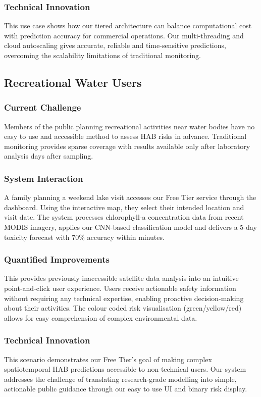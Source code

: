 \documentclass[conference]{IEEEtran}
\begin{document}
\subsubsection{Technical Innovation}
This use case shows how our tiered architecture can balance computational cost with prediction accuracy for commercial operations. Our multi-threading and cloud autoscaling gives accurate, reliable and time-sensitive predictions, overcoming the scalability limitations of traditional monitoring.

\subsection{Recreational Water Users}

\subsubsection{Current Challenge}
Members of the public planning recreational activities near water bodies have no easy to use and accessible method to assess HAB risks in advance. Traditional monitoring provides sparse coverage with results available only after laboratory analysis days after sampling.
\subsubsection{System Interaction}
A family planning a weekend lake visit accesses our Free Tier service through the dashboard. Using the interactive map, they select their intended location and visit date. The system processes chlorophyll-a concentration data from recent MODIS imagery, applies our CNN-based classification model and delivers a 5-day toxicity forecast with 70\% accuracy within minutes.
\subsubsection{Quantified Improvements}
This provides previously inaccessible satellite data analysis into an intuitive point-and-click user experience. Users receive actionable safety information without requiring any technical expertise, enabling proactive decision-making about their activities. The colour coded risk visualisation (green/yellow/red) allows for easy comprehension of complex environmental data.
\subsubsection{Technical Innovation}
This scenario demonstrates our Free Tier's goal of making complex spatiotemporal HAB predictions accessible to non-technical users. Our system addresses the challenge of translating research-grade modelling into simple, actionable public guidance through our easy to use UI and binary risk display.
\end{document}

